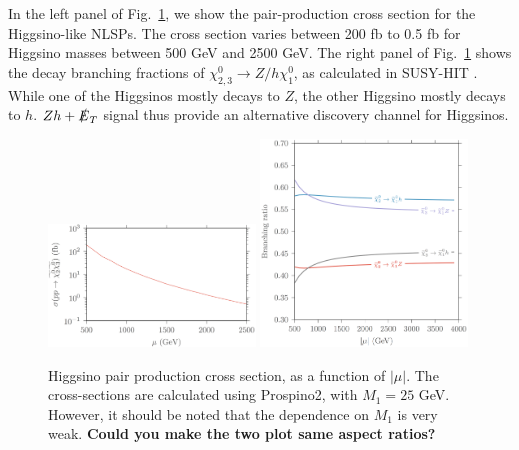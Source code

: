 \documentclass[a4paper,11pt]{article}
\newcommand{\Shufang}[1]{{\bf\color{Maroon}  #1}}
\newcommand{\image}[2]{\parbox{#1\textwidth}{\texttt{[image: images/\#2.pdf]}}}
\newcommand{\met}{{\slashed{E}_T}}
\begin{document}

In the left panel of Fig.~\ref{fig:xsection_plot}, we show the pair-production
cross section for the Higgsino-like NLSPs.  The cross section varies between
200 fb to 0.5 fb for Higgsino masses between 500 GeV and 2500 GeV. The right
panel of Fig.~\ref{fig:xsection_plot} shows the decay branching fractions of
$\chi_{2,3}^0\rightarrow Z/h \chi_1^0$, as calculated in SUSY-HIT \cite{Djouadi:2006bz}.
While one of the Higgsinos mostly decays to $Z$, the other
Higgsino mostly decays to $h$.  $Zh+\met$ signal thus provide an alternative
discovery channel for Higgsinos. 

\begin{figure}[h]
  \centering
  \includegraphics[width=0.49\textwidth]{images/higgsino_production_xsection.png}
  \includegraphics[width=0.49\textwidth]{images/higgsino_br_plot.png}
  \caption{Higgsino pair production cross section, as a function of $|\mu|$. The
  cross-sections are calculated using Prospino2, with $M_1 = 25$ GeV. However, it
  should be noted that the dependence on $M_1$ is very weak.  \Shufang{Could you make the two plot same aspect ratios?}}
  \label{fig:xsection_plot}
\end{figure}
\end{document}

